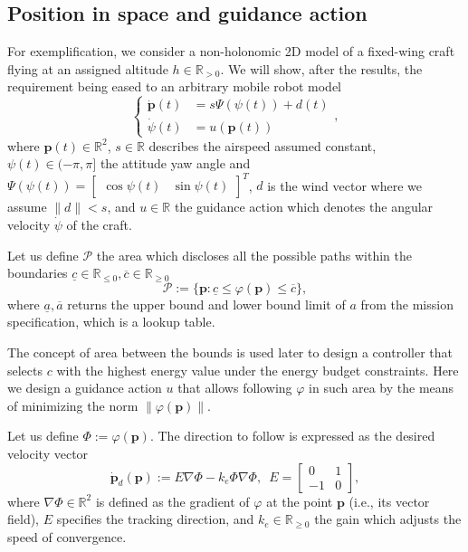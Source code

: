 \documentclass[letterpaper,10pt,conference]{ieeeconf}
\begin{document}
\subsection{Position in space and guidance action}
\label{sec:position}

For exemplification, we consider a non-holonomic 2D model of a fixed-wing craft flying at an assigned altitude $h\in\mathbb{R}_{>0}$. We will show, after the results, the requirement being eased to an arbitrary mobile robot model
\begin{equation}\label{eq:uav-kinem}\begin{cases}
  \dot{\mathbf{p}}(t)&=s\Psi(\psi(t))+d(t)\\
  \dot{\psi}(t)&=u(\mathbf{p}(t))
\end{cases},
\end{equation}
where $\mathbf{p}(t)\in\mathbb{R}^2$, $s\in\mathbb{R}$ describes the airspeed assumed constant, $\psi(t)\in(-\pi,\pi]$ the attitude yaw angle and $\Psi(\psi(t))=\begin{bmatrix}\cos{\psi(t)} & \sin{\psi(t)}\end{bmatrix}^T$, $d$ is the wind vector where we assume $\|d\|<s$, and $u\in\mathbb{R}$ the guidance action which denotes the angular velocity $\dot{\psi}$ of the craft.

Let us define $\mathcal{P}$ the area which discloses all the possible paths within the boundaries $\underline{c}\in\mathbb{R}_{\leq 0},\overline{c}\in\mathbb{R}_{\geq 0}$
\begin{equation}\label{eq:area}
  \mathcal{P}:=\{\mathbf{p}:\underline{c}\leq\varphi(\mathbf{p})\leq\overline{c}\},
\end{equation}
where $\underline{a},\overline{a}$ returns the upper bound and lower bound limit of $a$ from the mission specification, which is a lookup table.

The concept of area between the bounds is used later to design a controller that selects $c$ with the highest energy value under the energy budget constraints. Here we design a guidance action $u$ that allows following $\varphi$ in such area by the means of minimizing the norm $\|\varphi(\mathbf{p})\|$.

Let us define $\varPhi:=\varphi(\mathbf{p})$. The direction to follow is expressed as the desired velocity vector
\begin{equation}\label{eq:pd}
  \dot{\mathbf{p}}_d(\mathbf{p}):=E\nabla\varPhi-k_e\varPhi\nabla\varPhi,\,\,\,E=\begin{bmatrix}
    0&1\\-1&0
  \end{bmatrix},
\end{equation}
where $\nabla\varPhi\in\mathbb{R}^2$ is defined as the gradient of $\varphi$ at the point $\mathbf{p}$ (i.e., its vector field), $E$ specifies the tracking direction, and $k_e\in\mathbb{R}_{\geq 0}$ the gain which adjusts the speed of convergence.
\end{document}
